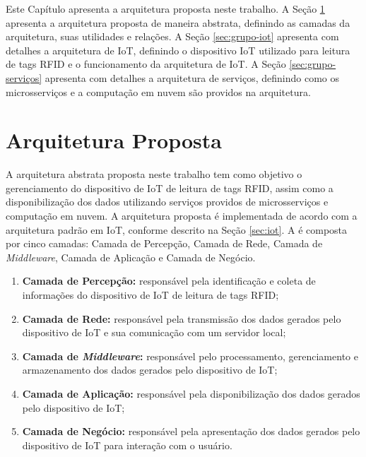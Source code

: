 \label{cap:desenvolvimento}

Este Capítulo apresenta a arquitetura proposta neste trabalho. A Seção \ref{sec:arquitetura-proposta} apresenta a arquitetura proposta de maneira abstrata, definindo as camadas da arquitetura, suas utilidades e relações. A Seção \ref{sec:grupo-iot} apresenta com detalhes a arquitetura de \acrlong{IoT}, definindo o dispositivo \acrshort{IoT} utilizado para leitura de tags \acrshort{RFID} e o funcionamento da arquitetura de \acrlong{IoT}. A Seção \ref{sec:grupo-serviços} apresenta com detalhes a arquitetura de serviços, definindo como os microsserviços e a computação em nuvem são providos na arquitetura.

\section{Arquitetura Proposta}
\label{sec:arquitetura-proposta}

A arquitetura abstrata proposta neste trabalho tem como objetivo o gerenciamento do dispositivo de \acrshort{IoT} de leitura de tags \acrshort{RFID}, assim como a disponibilização dos dados utilizando serviços providos de microsserviços e computação em nuvem. A arquitetura proposta é implementada de acordo com a arquitetura padrão em \acrlong{IoT}, conforme descrito na Seção \ref{sec:iot}. A  é composta por cinco camadas: Camada de Percepção, Camada de Rede, Camada de \textit{Middleware}, Camada de Aplicação e Camada de Negócio.
 
\begin{enumerate}
    \item \textbf{Camada de Percepção:} responsável pela identificação e coleta de informações do dispositivo de \acrshort{IoT} de leitura de tags \acrshort{RFID};
    \item \textbf{Camada de Rede:} responsável pela transmissão dos dados gerados pelo dispositivo de \acrshort{IoT} e sua comunicação com um servidor local;
    \item \textbf{Camada de \textit{Middleware}:} responsável pelo processamento, gerenciamento e armazenamento dos dados gerados pelo dispositivo de \acrshort{IoT};
    \item \textbf{Camada de Aplicação:} responsável pela disponibilização dos dados gerados pelo dispositivo de \acrshort{IoT};
    \item \textbf{Camada de Negócio:} responsável pela apresentação dos dados gerados pelo dispositivo de \acrshort{IoT} para interação com o usuário.
\end{enumerate}

